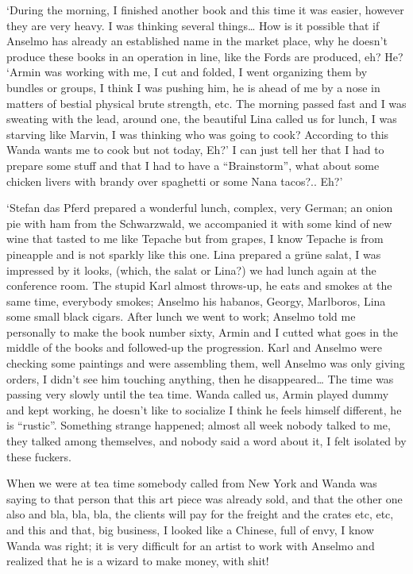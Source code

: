 \documentclass[smalldemyvopaper,11pt,twoside,onecolumn,openright,extrafontsizes]{memoir}
\begin{document}
\ornamentbreak

‘During the morning, I finished another book and this time it was easier, however they are very heavy. I was thinking several things… How is it possible that if Anselmo has already an established name in the market place, why he doesn’t produce these books in an operation in line, like the Fords are produced, eh? He?
‘Armin was working with me, I cut and folded, I went organizing them by bundles or groups, I think I was pushing him, he is ahead of me by a nose in matters of bestial physical brute strength, etc. The morning passed fast and I was sweating with the lead, around one, the beautiful Lina called us for lunch, I was starving like Marvin, I was thinking who was going to cook? According to this Wanda wants me to cook but not today, Eh?’ I can just tell her that I had to prepare some stuff and that I had to have a “Brainstorm”, what about some chicken livers with brandy over spaghetti or some Nana tacos?.. Eh?’

‘Stefan das Pferd prepared a wonderful lunch, complex, very German; an onion pie with ham from the Schwarzwald, we accompanied it with some kind of new wine that tasted to me like Tepache but from grapes, I know Tepache is from pineapple and is not sparkly like this one. Lina prepared a grüne salat, I was impressed by it looks, (which, the salat or Lina?) we had lunch again at the conference room. The stupid Karl almost throws-up, he eats and smokes at the same time, everybody smokes; Anselmo his habanos, Georgy, Marlboros, Lina some small black cigars. After lunch we went to work; Anselmo told me personally to make the book number sixty, Armin and I cutted what goes in the middle of the books and followed-up the progression. Karl and Anselmo were checking some paintings and were assembling them, well Anselmo was only giving orders, I didn’t see him touching anything, then he disappeared… The time was passing very slowly until the tea time. Wanda called us, Armin played dummy and kept working, he doesn’t like to socialize I think he feels himself different, he is “rustic”. Something strange happened; almost all week nobody talked to me, they talked among themselves, and nobody said a word about it, I felt isolated by these fuckers.

When we were at tea time somebody called from New York and Wanda was saying to that person that this art piece was already sold, and that the other one also and bla, bla, bla, the clients will pay for the freight and the crates etc, etc, and this and that, big business, I looked like a Chinese, full of envy, I know Wanda was right; it is very difficult for an artist to work with Anselmo and realized that he is a wizard to make money, with shit!
\end{document}
